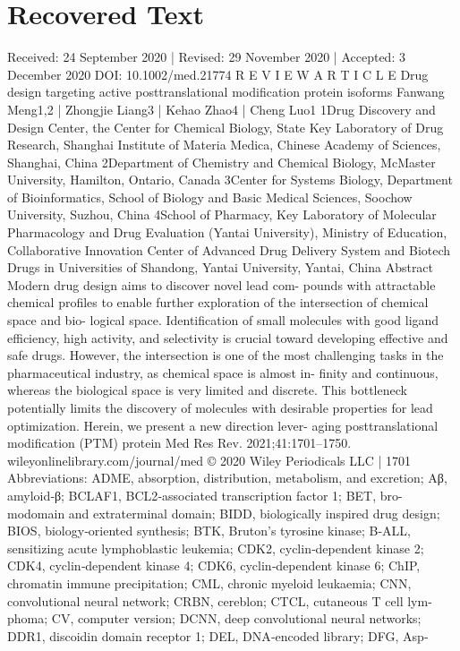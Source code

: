 \section{Recovered Text}
Received: 24 September 2020 |
Revised: 29 November 2020 |
Accepted: 3 December 2020
DOI: 10.1002/med.21774
R E V I E W A R T I C L E
Drug design targeting active posttranslational
modification protein isoforms
Fanwang Meng1,2
|
Zhongjie Liang3
|
Kehao Zhao4
|
Cheng Luo1
1Drug Discovery and Design Center, the
Center for Chemical Biology, State Key
Laboratory of Drug Research, Shanghai
Institute of Materia Medica, Chinese
Academy of Sciences, Shanghai, China
2Department of Chemistry and Chemical
Biology, McMaster University, Hamilton,
Ontario, Canada
3Center for Systems Biology, Department of
Bioinformatics, School of Biology and Basic
Medical Sciences, Soochow University,
Suzhou, China
4School of Pharmacy, Key Laboratory of
Molecular Pharmacology and Drug
Evaluation (Yantai University), Ministry of
Education, Collaborative Innovation Center
of Advanced Drug Delivery System and
Biotech Drugs in Universities of Shandong,
Yantai University, Yantai, China
Abstract
Modern drug design aims to discover novel lead com-
pounds with attractable chemical profiles to enable further
exploration of the intersection of chemical space and bio-
logical space. Identification of small molecules with good
ligand efficiency, high activity, and selectivity is crucial
toward developing effective and safe drugs. However, the
intersection is one of the most challenging tasks in the
pharmaceutical industry, as chemical space is almost in-
finity and continuous, whereas the biological space is very
limited and discrete. This bottleneck potentially limits the
discovery of molecules with desirable properties for lead
optimization. Herein, we present a new direction lever-
aging
posttranslational
modification
(PTM)
protein
Med Res Rev. 2021;41:1701–1750.
wileyonlinelibrary.com/journal/med
© 2020 Wiley Periodicals LLC | 1701
Abbreviations: ADME, absorption, distribution, metabolism, and excretion; Aβ, amyloid‐β; BCLAF1, BCL2‐associated transcription factor 1; BET, bro-
modomain and extraterminal domain; BIDD, biologically inspired drug design; BIOS, biology‐oriented synthesis; BTK, Bruton's tyrosine kinase; B‐ALL,
sensitizing acute lymphoblastic leukemia; CDK2, cyclin‐dependent kinase 2; CDK4, cyclin‐dependent kinase 4; CDK6, cyclin‐dependent kinase 6; ChIP,
chromatin immune precipitation; CML, chronic myeloid leukaemia; CNN, convolutional neural network; CRBN, cereblon; CTCL, cutaneous T cell lym-
phoma; CV, computer version; DCNN, deep convolutional neural networks; DDR1, discoidin domain receptor 1; DEL, DNA‐encoded library; DFG, Asp‐
